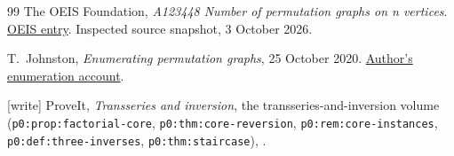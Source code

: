 \documentclass[11pt,letterpaper]{article}
\numberwithin{equation}{section}
\theoremstyle{definition}\newtheorem{definition}[theorem]{Definition}
\theoremstyle{remark}\newtheorem{remark}[theorem]{Remark}
\newcommand{\file}[1]{\nolinkurl{#1}}
\begin{document}
\begin{thebibliography}{99}
The OEIS Foundation,
\emph{A123448 Number of permutation graphs on n vertices}.
\href{https://oeis.org/A123448}{OEIS entry}.
Inspected source snapshot, 3 October 2026.

T.~Johnston,
\emph{Enumerating permutation graphs}, 25 October 2020.
\href{https://tomjohnston.co.uk/blog/2020-10-25-enumerating-permutation-graphs.html}{Author's enumeration account}.

\begingroup\raggedright
[write] ProveIt, \emph{Transseries and inversion}, the transseries-and-inversion
volume (\file{p0:prop:factorial-core}, \file{p0:thm:core-reversion},
\file{p0:rem:core-instances}, \file{p0:def:three-inverses},
\file{p0:thm:staircase}),
.
\par\endgroup
\end{thebibliography}
\end{document}
